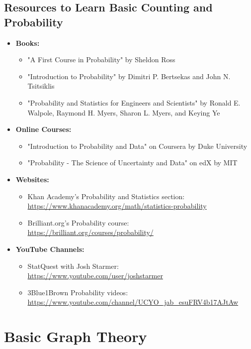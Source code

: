 \documentclass[openany]{book}
\begin{document}
\subsection{Resources to Learn Basic Counting and Probability}
\begin{itemize}
    \item \textbf{Books:}
    \begin{itemize}
        \item "A First Course in Probability" by Sheldon Ross
        \item "Introduction to Probability" by Dimitri P. Bertsekas and John N. Tsitsiklis
        \item "Probability and Statistics for Engineers and Scientists" by Ronald E. Walpole, Raymond H. Myers, Sharon L. Myers, and Keying Ye
    \end{itemize}
    \item \textbf{Online Courses:}
    \begin{itemize}
        \item "Introduction to Probability and Data" on Coursera by Duke University
        \item "Probability - The Science of Uncertainty and Data" on edX by MIT
    \end{itemize}
    \item \textbf{Websites:}
    \begin{itemize}
        \item Khan Academy's Probability and Statistics section: \url{https://www.khanacademy.org/math/statistics-probability}
        \item Brilliant.org's Probability course: \url{https://brilliant.org/courses/probability/}
    \end{itemize}
    \item \textbf{YouTube Channels:}
    \begin{itemize}
        \item StatQuest with Josh Starmer: \url{https://www.youtube.com/user/joshstarmer}
        \item 3Blue1Brown Probability videos: \url{https://www.youtube.com/channel/UCYO_jab_esuFRV4b17AJtAw}
    \end{itemize}
\end{itemize}
\section{Basic Graph Theory}
\end{document}
